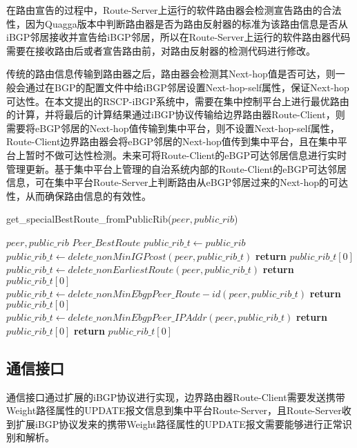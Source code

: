 在路由宣告的过程中，Route-Server上运行的软件路由器会检测宣告路由的合法性，因为Quagga版本中判断路由器是否为路由反射器的标准为该路由信息是否从iBGP邻居接收并宣告给iBGP邻居，所以在Route-Server上运行的软件路由器代码需要在接收路由后或者宣告路由前，对路由反射器的检测代码进行修改。

传统的路由信息传输到路由器之后，路由器会检测其Next-hop值是否可达，则一般会通过在BGP的配置文件中给iBGP邻居设置Next-hop-self属性，保证Next-hop可达性。在本文提出的RSCP-iBGP系统中，需要在集中控制平台上进行最优路由的计算，并将最后的计算结果通过iBGP协议传输给边界路由器Route-Client，则需要将eBGP邻居的Next-hop值传输到集中平台，则不设置Next-hop-self属性，Route-Client边界路由器会将eBGP邻居的Next-hop值传到集中平台，且在集中平台上暂时不做可达性检测。未来可将Route-Client的eBGP可达邻居信息进行实时管理更新。基于集中平台上管理的自治系统内部的Route-Client的eBGP可达邻居信息，可在集中平台Route-Server上判断路由从eBGP邻居过来的Next-hop的可达性，从而确保路由信息的有效性。

\begin{algorithm}[!h]
    \caption{get\_specialBestRoute\_fromPublicRib($peer,public\_rib$)}
    \label{alg:public selection_two}
    \begin{algorithmic}[1]%
         \REQUIRE
        $peer,public\_rib$
        \ENSURE
        $Peer\_BestRoute$
        \STATE $public\_rib\_t \gets public\_rib$
        \STATE $public\_rib\_t \gets delete\_nonMinIGPcost(peer, public\_rib\_t)$
        \STATE \textbf{return} $public\_rib\_t[0]$
        \ENDIF
        \STATE $public\_rib\_t \gets delete\_nonEarliestRoute(peer, public\_rib\_t)$
        \STATE \textbf{return} $public\_rib\_t[0]$
        \ENDIF
        \STATE $public\_rib\_t \gets delete\_nonMinEbgpPeer\_Route-id(peer, public\_rib\_t)$
        \STATE \textbf{return} $public\_rib\_t[0]$
        \ENDIF
        \STATE $public\_rib\_t \gets delete\_nonMinEbgpPeer\_IPAddr(peer, public\_rib\_t)$
        \STATE \textbf{return} $public\_rib\_t[0]$
        \ENDIF
        \STATE \textbf{return} $public\_rib\_t[0]$
    \end{algorithmic}
\end{algorithm}


\subsection{通信接口}
通信接口通过扩展的iBGP协议进行实现，边界路由器Route-Client需要发送携带Weight路径属性的UPDATE报文信息到集中平台Route-Server，且Route-Server收到扩展iBGP协议发来的携带Weight路径属性的UPDATE报文需要能够进行正常识别和解析。

